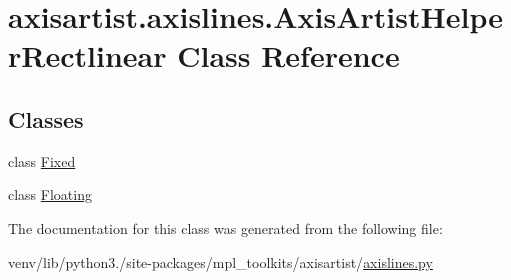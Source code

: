 \hypertarget{classaxisartist_1_1axislines_1_1AxisArtistHelperRectlinear}{}\section{axisartist.\+axislines.\+Axis\+Artist\+Helper\+Rectlinear Class Reference}
\label{classaxisartist_1_1axislines_1_1AxisArtistHelperRectlinear}
\subsection*{Classes}
\begin{DoxyCompactItemize}
\item 
class \hyperlink{classaxisartist_1_1axislines_1_1AxisArtistHelperRectlinear_1_1Fixed}{Fixed}
\item 
class \hyperlink{classaxisartist_1_1axislines_1_1AxisArtistHelperRectlinear_1_1Floating}{Floating}
\end{DoxyCompactItemize}


The documentation for this class was generated from the following file\+:\begin{DoxyCompactItemize}
\item 
venv/lib/python3./site-\/packages/mpl\+\_\+toolkits/axisartist/\hyperlink{axisartist_2axislines_8py}{axislines.\+py}\end{DoxyCompactItemize}
